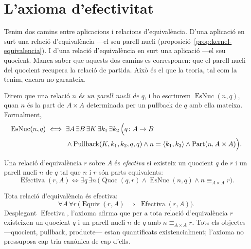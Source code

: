 \section{L'axioma d'efectivitat}\label{sec:exactitud}

Tenim dos camins entre aplicacions i relacions d'equivalència. D'una aplicació en surt una relació d'equivalència ---el seu parell nucli (proposició~\ref{prop:kernel-equivalencia}). I d'una relació d'equivalència en surt una aplicació ---el seu quocient. Manca saber que aquests dos camins es corresponen: que el parell nucli del quocient recupera la relació de partida. Això és el que la teoria, tal com la tenim, encara no garanteix.

\begin{definicio}\label{def:esparellnucli}
Direm que una relació \(n\) \emph{és un parell nucli de \(q\)}, i ho escriurem \(\operatorname{EsNuc}(n,q)\), quan \(n\) és la part de \(A\times A\) determinada per un pullback de \(q\) amb ella mateixa. Formalment,
\[
\begin{aligned}
\operatorname{EsNuc}(n,q)
\iff{}&
\exists A\,\exists B\,\exists K\,\exists k_1\,\exists k_2\,\Bigl(
q\colon A\to B
\\
&{}\land\operatorname{Pullback}(K,k_1,k_2,q,q)
\land n=\langle k_1,k_2\rangle
\land\operatorname{Part}(n,A\times A)
\Bigr).
\end{aligned}
\]
\end{definicio}

\begin{definicio}\label{def:efectiva}
Una relació d'equivalència \(r\) sobre \(A\) és \emph{efectiva} si existeix un quocient \(q\) de \(r\) i un parell nucli \(n\) de \(q\) tal que \(n\) i \(r\) són parts equivalents:
\[
\operatorname{Efectiva}(r,A)
\iff
\exists q\,\exists n\,\bigl(
\operatorname{Quoc}(q,r)\land\operatorname{EsNuc}(n,q)\land n\equiv_{A\times A}r
\bigr).
\]
\end{definicio}

\begin{axioma}\label{ax:exactitud}
Tota relació d'equivalència és efectiva:
\[
\forall A\,\forall r\,\bigl(
\operatorname{Equiv}(r,A)
\;\Rightarrow\;
\operatorname{Efectiva}(r,A)
\bigr).
\]
Desplegant \(\operatorname{Efectiva}\), l'axioma afirma que per a tota relació d'equivalència \(r\) existeixen un quocient \(q\) i un parell nucli \(n\) de \(q\) amb \(n\equiv_{A\times A}r\). Tots els objectes ---quocient, pullback, producte--- estan quantificats existencialment; l'axioma no pressuposa cap tria canònica de cap d'ells.
\end{axioma}

